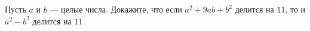 Пусть $a$ и $b$ --- целые числа. Докажите, что если $a^2 + 9ab + b^2$ делится на $11$, то и $a^2 - b^2$ делится на $11$.